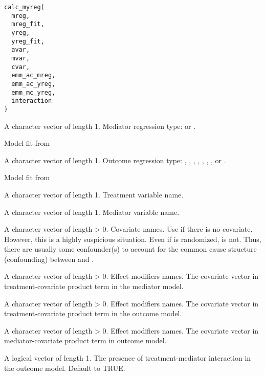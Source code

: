 \documentclass[a4paper]{book}
\begin{document}
%
\begin{Usage}
\begin{verbatim}
calc_myreg(
  mreg,
  mreg_fit,
  yreg,
  yreg_fit,
  avar,
  mvar,
  cvar,
  emm_ac_mreg,
  emm_ac_yreg,
  emm_mc_yreg,
  interaction
)
\end{verbatim}
\end{Usage}
%
\begin{Arguments}
\begin{ldescription}
\item[\code{mreg}] A character vector of length 1. Mediator regression type:  or .

\item[\code{mreg\_fit}] Model fit from 

\item[\code{yreg}] A character vector of length 1. Outcome regression type: , , , , , , , or .

\item[\code{yreg\_fit}] Model fit from 

\item[\code{avar}] A character vector of length 1. Treatment variable name.

\item[\code{mvar}] A character vector of length 1. Mediator variable name.

\item[\code{cvar}] A character vector of length > 0. Covariate names. Use  if there is no covariate. However, this is a highly suspicious situation. Even if  is randomized,  is not. Thus, there are usually some confounder(s) to account for the common cause structure (confounding) between  and .

\item[\code{emm\_ac\_mreg}] A character vector of length > 0. Effect modifiers names. The covariate vector in treatment-covariate product term in the mediator model.

\item[\code{emm\_ac\_yreg}] A character vector of length > 0. Effect modifiers names. The covariate vector in treatment-covariate product term in the outcome model.

\item[\code{emm\_mc\_yreg}] A character vector of length > 0. Effect modifiers names. The covariate vector in mediator-covariate product term in outcome model.

\item[\code{interaction}] A logical vector of length 1. The presence of treatment-mediator interaction in the outcome model. Default to TRUE.
\end{ldescription}
\end{Arguments}
\end{document}
